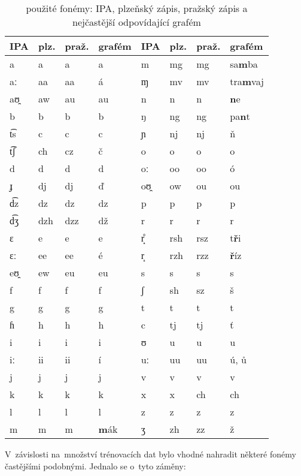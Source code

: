 \begin{table}[htpb]
\begin{center}
\begin{tabular}{|l|l|l|l||l|l|l|l|}
\hline
IPA & plz. & praž. & grafém & IPA & plz. & praž. & grafém \\
\hline
a & a & a & a &                m & mg & mg & sa\textbf{m}ba \\
aː & aa & aa & á &             ɱ  & mv & mv & tra\textbf{m}vaj \\
aʊ̯ & aw & au & au &            n  & n & n & \textbf{n}e \\
b & b & b & b &                ŋ & ng & ng & pa\textbf{n}t \\
t͡s & c & c & c &               ɲ  & nj & nj & \v{n} \\
t͡ʃ & ch & cz & č &             o  & o & o & o \\
d & d & d & d &                oː & oo & oo & ó \\
ɟ & dj & dj & \v{d} &          oʊ̯ & ow & ou & ou \\
d͡z & dz & dz & dz &            p  & p & p & p \\
d͡ʒ & dzh & dzz & dž &          r  & r & r & r \\
ɛ & e & e & e &                r̝̊ & rsh & rsz & t\textbf{\v{r}}i \\
ɛː & ee & ee & é &             r̝  & rzh & rzz & \textbf{\v{r}}íz \\
eʊ̯ & ew & eu & eu &            s  & s & s & s \\
f & f & f & f &                ʃ & sh & sz & š \\
g & g & g & g &                t & t & t & t \\
ɦ & h & h & h &                c & tj & tj & \v{t} \\
i & i & i & i &                ʊ & u & u & u \\
iː & ii & ii & í &             uː  & uu & uu & ú, \r{u} \\
j & j & j & j &                v & v & v & v \\
k & k & k & k &                x & x & ch & ch \\
l & l & l & l &                z & z & z & z \\
m & m & m & \textbf{m}ák &     ʒ & zh & zz & ž \\
\hline
\end{tabular}
\caption{použité fonémy: IPA, plzeňský zápis, pražský zápis a nejčastější
odpovídající grafém}\label{tab:phones}
\end{center}
\end{table}
\normalfont

V~závislosti na~množství trénovacích dat bylo vhodné nahradit některé fonémy
častějšími podobnými. Jednalo se o~tyto záměny:

